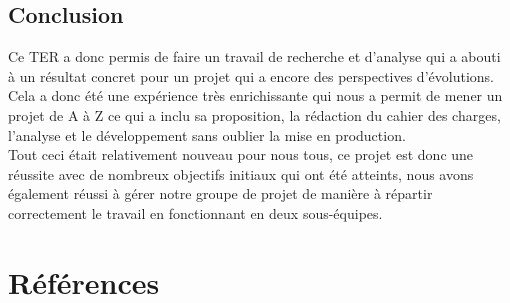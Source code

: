 \documentclass{report}
\begin{document}
		\section{Conclusion}
		Ce TER a donc permis de faire un travail de recherche et d'analyse qui a abouti à un résultat concret pour un projet qui a encore des perspectives d'évolutions.
		Cela a donc été une expérience très enrichissante qui nous a permit de mener un projet de A à Z ce qui a inclu sa proposition, la rédaction du cahier des charges, l'analyse et le développement sans oublier la mise en production. \\
		Tout ceci était relativement nouveau pour nous tous, ce projet est donc une réussite avec de nombreux objectifs initiaux qui ont été atteints, nous avons également réussi à gérer notre groupe de projet de manière à répartir correctement le travail en fonctionnant en deux sous-équipes. \\ 
	
	\chapter{Références}
	
\end{document}
